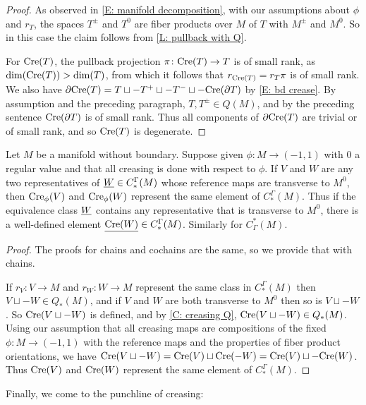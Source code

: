 \begin{proof}
	As observed in \cref{E: manifold decomposition}, with our assumptions about $\phi$ and $r_T$, the spaces $T^\pm$ and $T^0$ are fiber products over $M$ of $T$ with $M^\pm$ and $M^0$.
	So in this case the claim follows from \cref{L: pullback with Q}.

	For $\mathrm{Cre}(T)$, the pullback projection $\pi \colon \mathrm{Cre}(T) \to T$ is of small rank, as $\dim(\mathrm{Cre}(T))>\dim(T)$, from which it follows that $r_{\mathrm{Cre}(T)} = r_T\pi$ is of small rank.
	We also have $\partial \mathrm{Cre}(T) = T \sqcup - T^+ \sqcup -T^- \sqcup -\mathrm{Cre}(\partial T)$ by \cref{E: bd crease}.
	By assumption and the preceding paragraph, $T, T^\pm \in Q(M)$, and by the preceding sentence $\mathrm{Cre}(\partial T)$ is of small rank.
	Thus all components of $\partial \mathrm{Cre}(T)$ are trivial or of small rank, and so $\mathrm{Cre}(T)$ is degenerate.
\end{proof}

\begin{proposition}
	Let $M$ be a manifold without boundary.
	Suppose given $\phi \colon M \to (-1,1)$ with $0$ a regular value and that all creasing is done with respect to $\phi$.
	If $V$ and $W$ are any two representatives of $\underline{W} \in C_*^\Gamma(M)$ whose reference maps are transverse to $M^0$, then $\mathrm{Cre}_\phi(V)$ and $\mathrm{Cre}_\phi(W)$ represent the same element of $C_*^\Gamma(M)$.
	Thus if the equivalence class $\underline{W}$ contains any representative that is transverse to $M^0$, there is a well-defined element $\underline{\mathrm{Cre}(W)} \in C_*^\Gamma(M)$.
	Similarly for $C^*_\Gamma(M)$.
\end{proposition}

\begin{proof}
	The proofs for chains and cochains are the same, so we provide that with chains.

	If $r_V \colon V \to M$ and $r_W \colon W \to M$ represent the same class in $C_*^\Gamma(M)$ then $V \sqcup -W \in Q_*(M)$, and if $V$ and $W$ are both transverse to $M^0$ then so is $V \sqcup -W$.
	So $\mathrm{Cre}(V\sqcup-W)$ is defined, and by \cref{C: creasing Q}, $\mathrm{Cre}(V \sqcup -W) \in Q_*(M)$.
	Using our assumption that all creasing maps are compositions of the fixed $\phi \colon M \to (-1,1)$ with the reference maps and the properties of fiber product orientations, we have $\mathrm{Cre}(V \sqcup -W) = \mathrm{Cre}(V) \sqcup \mathrm{Cre}(-W) = \mathrm{Cre}(V) \sqcup -\mathrm{Cre}(W)$.
	Thus $\mathrm{Cre}(V)$ and $\mathrm{Cre}(W)$ represent the same element of $C_*^\Gamma(M)$.
\end{proof}

Finally, we come to the punchline of creasing:

